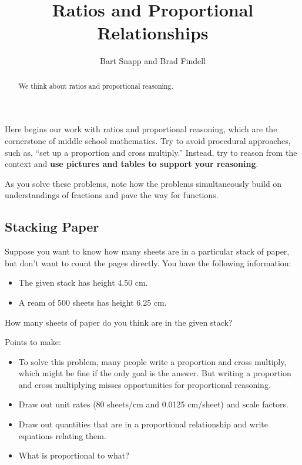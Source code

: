 \documentclass[nooutcomes]{ximera}
\title{Ratios and Proportional Relationships}
\author{Bart Snapp and Brad Findell}
\begin{document}
\begin{abstract}
We think about ratios and proportional reasoning.
\end{abstract}
\maketitle

\label{A:ratioLaunch}
Here begins our work with ratios and proportional reasoning, which are the cornerstone of middle school mathematics.  Try to avoid procedural approaches, such as, ``set up a proportion and cross multiply.''  Instead, try to reason from the context and \textbf{use pictures and tables to support your reasoning}.  

As you solve these problems, note how the problems simultaneously build on understandings of fractions and pave the way for functions.  


\subsection*{Stacking Paper}
\begin{problem}
Suppose you want to know how many sheets are in a particular stack of paper, but don't want to count the pages directly. You have the following information:
\begin{itemize}
\item The given stack has height 4.50 cm.
\item A ream of 500 sheets has height 6.25 cm.
\end{itemize}
How many sheets of paper do you think are in the given stack?
\end{problem}


\begin{teachingnote}
Points to make: 
\begin{itemize}
\item To solve this problem, many people write a proportion and cross multiply, which might be fine if the only goal is the answer.  
But writing a proportion and cross multiplying misses opportunities for proportional reasoning.  
\item Draw out unit rates (80 sheets/cm and 0.0125 cm/sheet) and scale factors.  
\item Draw out quantities that are in a proportional relationship and write equations relating them.  
\item What is proportional to what?  
\end{itemize}
\end{teachingnote}
\end{document}
